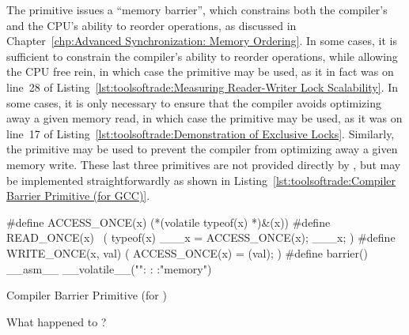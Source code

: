 The  primitive issues a ``memory barrier'',
which constrains both the compiler's and the CPU's ability to reorder
operations, as discussed in
Chapter~\ref{chp:Advanced Synchronization: Memory Ordering}.
In some cases, it is sufficient to constrain the compiler's ability
to reorder operations, while allowing the CPU free rein, in which
case the  primitive may be used, as it in fact was
on line~28 of
Listing~\ref{lst:toolsoftrade:Measuring Reader-Writer Lock Scalability}.
In some cases, it is only necessary to ensure that the compiler
avoids optimizing away a given memory read, in which case the
 primitive may be used, as it was on line~17 of
Listing~\ref{lst:toolsoftrade:Demonstration of Exclusive Locks}.
Similarly, the  primitive may be used to prevent the
compiler from optimizing away a given memory write.
These last three primitives are not provided directly by \GCC,
but may be implemented straightforwardly as shown in
Listing~\ref{lst:toolsoftrade:Compiler Barrier Primitive (for GCC)}.
\fi

\begin{listing}[tb]
{ \scriptsize
\begin{verbbox}
#define ACCESS_ONCE(x) (*(volatile typeof(x) *)&(x))
#define READ_ONCE(x) \
            ({ typeof(x) ___x = ACCESS_ONCE(x); ___x; })
#define WRITE_ONCE(x, val) ({ ACCESS_ONCE(x) = (val); })
#define barrier() __asm__ __volatile__("": : :"memory")
\end{verbbox}
}
\centering
\theverbbox
\caption{Compiler Barrier Primitive (for \GCC)}
\label{lst:toolsoftrade:Compiler Barrier Primitive (for GCC)}
\end{listing}

\QuickQuiz{}
	What happened to ?
 \QuickQuizEnd


